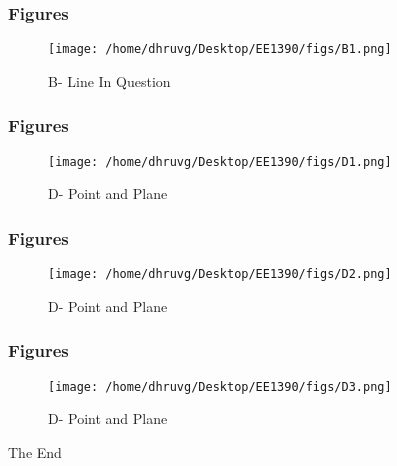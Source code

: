 \documentclass{beamer}
\begin{document}

\begin{frame}
\frametitle{Figures}
\begin{figure}[H]
    \texttt{[image: /home/dhruvg/Desktop/EE1390/figs/B1.png]}
    \caption{B- Line In Question}
    \label{B}
\end{figure}
\end{frame}


\begin{frame}
\frametitle{Figures}
\begin{figure}[H]
    \texttt{[image: /home/dhruvg/Desktop/EE1390/figs/D1.png]}
    \caption{D- Point and Plane}
    \label{D}
\end{figure}
\end{frame}


\begin{frame}
\frametitle{Figures}
\begin{figure}[H]
    \texttt{[image: /home/dhruvg/Desktop/EE1390/figs/D2.png]}
    \caption{D- Point and Plane}
    \label{D}
\end{figure}
\end{frame}


\begin{frame}
\frametitle{Figures}
\begin{figure}[H]
    \texttt{[image: /home/dhruvg/Desktop/EE1390/figs/D3.png]}
    \caption{D- Point and Plane}
    \label{D}
\end{figure}
\end{frame}
 \begin{frame}
\Huge{\centerline{The End}}
\end{frame}
\end{document}
